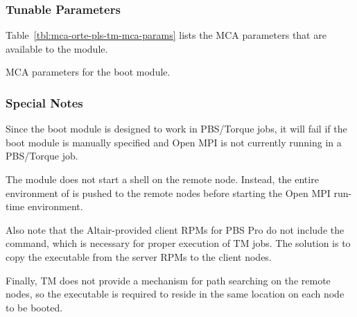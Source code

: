

\subsubsection{Tunable Parameters}

Table~\ref{tbl:mca-orte-pls-tm-mca-params} lists the MCA parameters
that are available to the  module.

\begin{table}[htbp]
  \begin{ssiparamtb}
%
  \end{ssiparamtb}
  \caption{MCA parameters for the  boot module.}
  \label{tbl:mca-orte-pls-tm-mca-params}
\end{table}


\subsubsection{Special Notes}

Since the  boot module is designed to work in PBS/Torque
jobs, it will fail if the  boot module is manually specified
and Open MPI is not currently running in a PBS/Torque job.

The  module does not start a shell on the remote node.
Instead, the entire environment of  is pushed to the
remote nodes before starting the Open MPI run-time environment.
  
Also note that the Altair-provided client RPMs for PBS Pro do not
include the  command, which is necessary for proper
execution of TM jobs.  The solution is to copy the executable from the
server RPMs to the client nodes.
  
Finally, TM does not provide a mechanism for path searching on the
remote nodes, so the  executable is required to reside in
the same location on each node to be booted.




